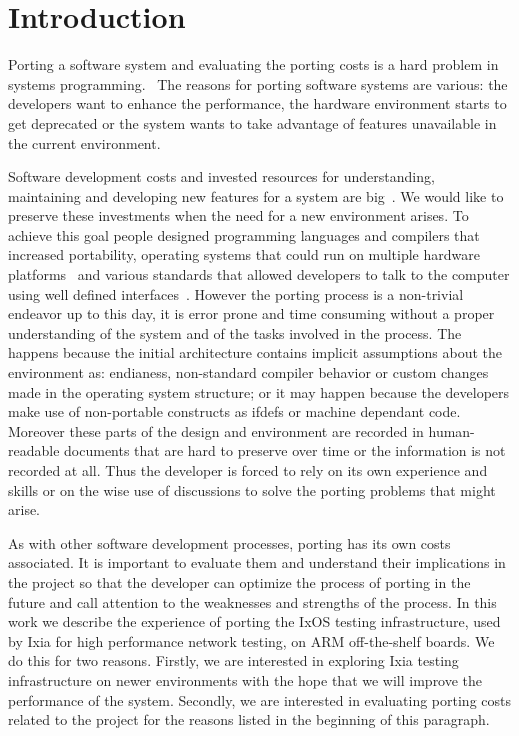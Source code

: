 \section{Introduction}

Porting a software system and evaluating the porting costs is a hard problem in
systems programming.~\cite{b1,b2,b4,b5,b9,b10,b11,b12,b13,b14,b15,b16} The
reasons for porting software systems are various: the developers want to enhance
the performance, the hardware environment starts to get deprecated or the system
wants to take advantage of features unavailable in the current environment.

Software development costs and invested resources for understanding, maintaining
and developing new features for a system are big~\cite{b17,b18,b19}. We would
like to preserve these investments when the need for a new environment arises.
To achieve this goal people designed programming languages and compilers that
increased portability, operating systems that could run on multiple hardware
platforms~\cite{b16} and various standards that allowed developers to talk to
the computer using well defined interfaces~\cite{b20}.  However the porting
process is a non-trivial endeavor up to this day, it is error prone and time
consuming  without a proper understanding of the system and of the tasks involved
in the process. The happens because the initial architecture contains implicit
assumptions about the environment as: endianess, non-standard compiler behavior
or custom changes made in the operating system structure; or it may happen
because the developers make use of non-portable constructs as ifdefs \cite{b21}
or machine dependant code. Moreover these parts of the design and environment
are recorded in human-readable documents that are hard to preserve over time or
the information is not recorded at all. Thus the developer is forced to rely on
its own experience and skills or on the wise use of discussions to solve the
porting problems that might arise.

As with other software development processes, porting has its own costs
associated. It is important to evaluate them and understand their implications
in the project so that the developer can optimize the process of porting in the
future and call attention to the weaknesses and strengths of the process. In
this work we describe the experience of porting the IxOS testing infrastructure,
used by Ixia for high performance network testing, on ARM off-the-shelf boards.
We do this for two reasons. Firstly, we are interested in exploring Ixia testing
infrastructure on newer environments with the hope that we will improve the
performance of the system. Secondly, we are interested in evaluating porting
costs related to the project for the reasons listed in the beginning of this
paragraph. 

